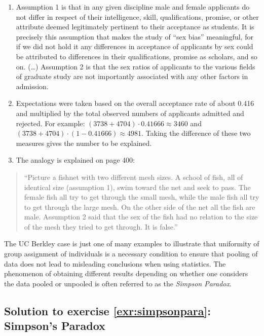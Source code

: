 \documentclass[
  12pt,
  oneside]{book}
\providecommand{\tightlist}{%
  \setlength{\itemsep}{0pt}\setlength{\parskip}{0pt}}
\theoremstyle{definition}
\theoremstyle{definition}
\theoremstyle{definition}
\theoremstyle{definition}
\theoremstyle{remark}
\begin{document}
\begin{enumerate}
\def\labelenumi{\alph{enumi})}
\tightlist
\item
  Assumption 1 is that in any given discipline male and female applicants do not differ in respect of their intelligence, skill, qualifications, promise, or other attribute deemed legitimately pertinent to their acceptance as students. It is precisely this assumption that makes the study of ``sex bias'' meaningful, for if we did not hold it any differences in acceptance of applicants by sex could be attributed to differences in their qualifications, promise as scholars, and so on. (\ldots) Assumption 2 is that the sex ratios of applicants to the various fields of graduate study are not importantly associated with any other factors in admission. \citep[page 398]{Bickel1975Sex}
\item
  Expectations were taken based on the overall acceptance rate of about 0.416 and multiplied by the total observed numbers of applicants admitted and rejected. For example: \((3738+4704) \cdot 0.41666 \approx 3460\) and \((3738+4704) \cdot (1-0.41666) \approx 4981\). Taking the difference of these two measures gives the number to be explained.
\item
  The analogy is explained on page 400:
\end{enumerate}

\begin{quote}
``Picture a fishnet with two different mesh sizes. A school of fish, all of identical size (assumption 1), swim toward the net and seek to pass. The female fish all try to get through the small mesh, while the male fish all try to get through the large mesh. On the other side of the net all the fish are male. Assumption 2 said that the sex of the fish had no relation to the size of the mesh they tried to get through. It is false.''
\end{quote}

The UC Berkley case is just one of many examples to illustrate that uniformity of group assignment of individuals is a necessary condition to ensure that pooling of data does not lead to misleading conclusions when using statistics. The phenomenon of obtaining different results depending on whether one considers the data pooled or unpooled is often referred to as the \emph{Simpson Paradox}.

\hypertarget{sol:simpsonpara}{%
\subsection*{Solution to exercise \ref{exr:simpsonpara}: Simpson's Paradox}\label{sol:simpsonpara}}
\end{document}
